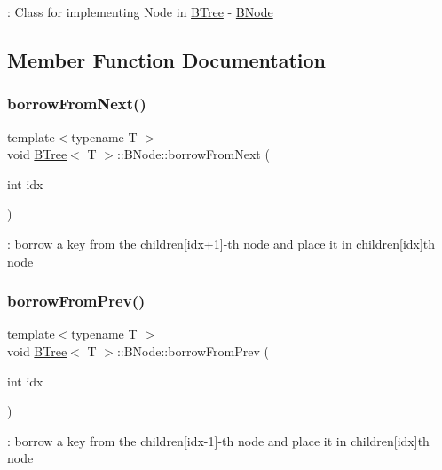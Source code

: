 \+: Class for implementing Node in \hyperlink{classBTree}{B\+Tree} -\/ \hyperlink{classBTree_1_1BNode}{B\+Node} 

\subsection{Member Function Documentation}
\mbox{\label{classBTree_1_1BNode_acda705e13267fdedbfd27f017668a9bf}} 
\subsubsection{\texorpdfstring{borrow\+From\+Next()}{borrowFromNext()}}
{\footnotesize\ttfamily template$<$typename T $>$ \\
void \hyperlink{classBTree}{B\+Tree}$<$ T $>$\+::B\+Node\+::borrow\+From\+Next (\begin{DoxyParamCaption}\item[{int}]{idx }\end{DoxyParamCaption})}

\+: borrow a key from the children\mbox{[}idx+1\mbox{]}-\/th node and place it in children\mbox{[}idx\mbox{]}th node \mbox{\label{classBTree_1_1BNode_a1ee99a5c0649e19e8a34934ff8dba85b}} 
\subsubsection{\texorpdfstring{borrow\+From\+Prev()}{borrowFromPrev()}}
{\footnotesize\ttfamily template$<$typename T $>$ \\
void \hyperlink{classBTree}{B\+Tree}$<$ T $>$\+::B\+Node\+::borrow\+From\+Prev (\begin{DoxyParamCaption}\item[{int}]{idx }\end{DoxyParamCaption})}

\+: borrow a key from the children\mbox{[}idx-\/1\mbox{]}-\/th node and place it in children\mbox{[}idx\mbox{]}th node \mbox{\label{classBTree_1_1BNode_a20d3152742afa0fbb11e413a0c73ceb9}} 
